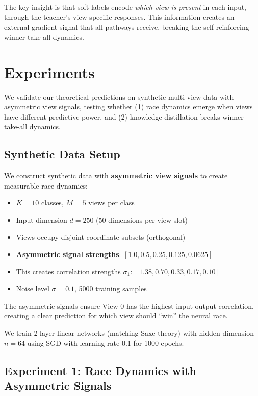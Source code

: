 \documentclass{article}
\begin{document}
The key insight is that soft labels encode \emph{which view is present} in each input, through the teacher's view-specific responses. This information creates an external gradient signal that all pathways receive, breaking the self-reinforcing winner-take-all dynamics.

\section{Experiments}
\label{sec:experiments}

We validate our theoretical predictions on synthetic multi-view data with asymmetric view signals, testing whether (1) race dynamics emerge when views have different predictive power, and (2) knowledge distillation breaks winner-take-all dynamics.

\subsection{Synthetic Data Setup}

We construct synthetic data with \textbf{asymmetric view signals} to create measurable race dynamics:
\begin{itemize}
    \item $K = 10$ classes, $M = 5$ views per class
    \item Input dimension $d = 250$ (50 dimensions per view slot)
    \item Views occupy disjoint coordinate subsets (orthogonal)
    \item \textbf{Asymmetric signal strengths}: $[1.0, 0.5, 0.25, 0.125, 0.0625]$
    \item This creates correlation strengths $\sigma_1$: $[1.38, 0.70, 0.33, 0.17, 0.10]$
    \item Noise level $\sigma = 0.1$, 5000 training samples
\end{itemize}

The asymmetric signals ensure View 0 has the highest input-output correlation, creating a clear prediction for which view should ``win'' the neural race.

We train 2-layer linear networks (matching Saxe theory) with hidden dimension $n = 64$ using SGD with learning rate 0.1 for 1000 epochs.

\subsection{Experiment 1: Race Dynamics with Asymmetric Signals}
\end{document}
